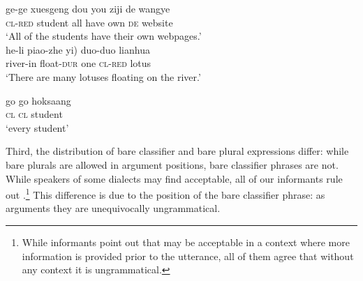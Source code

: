 \documentclass[output=paper]{langscibook}
\begin{document}
\ea \label{schv-nem:ex:24}
\ea \label{schv-nem:ex:24a}
\gll ge-ge xuesgeng dou you ziji de wangye\\  
\textsc{cl}-\textsc{red} student all have own \textsc{de} website\\
\glt `All of the students have their own webpages.'\\\hfill \citep[Mandarin Chinese;][p. 118, ex. (234a)]{zhang-13}
\ex \label{schv-nem:ex:24b}
\gll he-li piao-zhe \minsp{(} yi) duo-duo lianhua \\
river-in float-\textsc{dur} {} one \textsc{cl}-\textsc{red} lotus\\
\glt `There are many lotuses floating on the river.'\\ \hfill \citep[Mandarin Chinese;][p. 118, ex. (230a)]{zhang-13}
\z
\z


\ea \label{schv-nem:ex:25}
\gll go go hoksaang \\
\textsc{cl} \textsc{cl} student\\
\glt `every student' \hfill \citep[Cantonese;][p. 16]{wong-98}
\z


\noindent Third, the distribution of bare classifier and bare plural expressions differ: while bare plurals are allowed in argument positions, bare classifier phrases are not. While speakers of some dialects may find  acceptable, all of our informants rule out .\footnote{While informants point out that  may be acceptable in a context where more information is provided prior to the utterance, all of them agree that without any context it is ungrammatical.} This difference is due to the position of the bare classifier phrase: as arguments they are unequivocally ungrammatical.  
\end{document}
